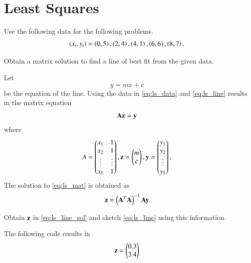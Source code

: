 \documentclass[journal,12pt,twocolumn]{IEEEtran}
\begin{document}
\section{Least Squares}
Use the following data for the following problems.
\begin{equation}
\label{eq:ls_data}
\left(x_i,y_i\right) = \left(0,5\right), \left(2,4\right), \left(4,1\right), \left(6,6\right), \left(8,7\right).
\end{equation}
\begin{problem}
Obtain a matrix solution to find a line of best fit from the given data.
\end{problem}
\solution Let
\begin{equation}
\label{eq:ls_line}
y = mx + c
\end{equation}
be the equation of the line.  Using the data in \eqref{eq:ls_data} and \eqref{eq:ls_line} results in the matrix equation
\begin{equation}
\label{eq:ls_mat}
\mathbf{A}\mathbf{z} = \mathbf{y}
\end{equation}
%
where 
%
\begin{equation}
A = 
\begin{pmatrix}
x_1 & 1
\\
x_2 & 1
\\
\vdots & \vdots
\\
x_5 & 1
\end{pmatrix},
\mathbf{z} = 
\begin{pmatrix}
m
\\
c
\end{pmatrix},
\mathbf{y} = 
\begin{pmatrix}
y_1 
\\
y_2 
\\
\vdots 
\\
y_5 
\end{pmatrix},
\end{equation}
%
The solution to \eqref{eq:ls_mat}  is obtained as
\begin{equation}
\label{eq:ls_line_sol}
\mathbf{z} = \left(\mathbf{A}^{T}\mathbf{A}\right)^{-1}\mathbf{A}\mathbf{y}
\end{equation}
\begin{problem}
Obtain $\mathbf{z}$ in \eqref{eq:ls_line_sol} and sketch \eqref{eq:ls_line} using this information.
\end{problem}
\solution The following code results in
\begin{equation}
\mathbf{z} =
\begin{pmatrix}
0.3
\\
3.4
\end{pmatrix} 
\end{equation}
\end{document}
